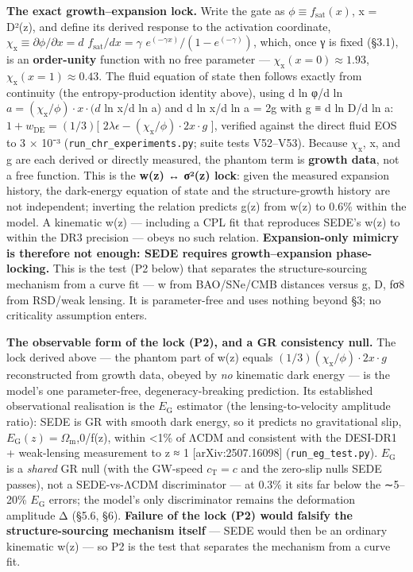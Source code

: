 \documentclass[
  10pt,
]{article}
\begin{document}
\textbf{The exact growth--expansion lock.} Write the gate as
\(\phi  \equiv  f_{\mathrm{sat}}(x)\), x = D²(z), and define its derived
response to the activation coordinate,
\(\chi _{\mathrm{x}} \equiv  \partial \phi /\partial x = d\)
\(f_{\mathrm{sat}}/dx = \gamma\) \(e^(-\gamma x)/(1 - e^(-\gamma ))\),
which, once γ is fixed (§3.1), is an \textbf{order-unity} function with
no free parameter --- \(\chi _{\mathrm{x}}(x=0) \approx  1.93\),
\(\chi _{\mathrm{x}}(x=1) \approx  0.43\). The fluid equation of state
then follows exactly from continuity (the entropy-production identity
above), using d ln φ/d ln
\(a = (\chi _{\mathrm{x}}/\phi )\cdot x\cdot (d\) ln x/d ln a) and d ln
x/d ln a = 2g with g ≡ d ln D/d ln a: \(1 + w_{\mathrm{DE}} = (1/3)[\)
\(2\lambda \epsilon  - (\chi _{\mathrm{x}}/\phi )\cdot 2x\cdot g\) {]},
verified against the direct fluid EOS to 3 × 10⁻³
(\texttt{run\_chr\_experiments.py}; suite tests V52--V53). Because
\(\chi _{\mathrm{x}}\), x, and g are each derived or directly measured,
the phantom term is \textbf{growth data}, not a free function. This is
the \textbf{w(z) ↔ σ²(z) lock}: given the measured expansion history,
the dark-energy equation of state and the structure-growth history are
not independent; inverting the relation predicts g(z) from w(z) to 0.6\%
within the model. A kinematic w(z) --- including a CPL fit that
reproduces SEDE's w(z) to within the DR3 precision --- obeys no such
relation. \textbf{Expansion-only mimicry is therefore not enough: SEDE
requires growth--expansion phase-locking.} This is the test (P2 below)
that separates the structure-sourcing mechanism from a curve fit --- w
from BAO/SNe/CMB distances versus g, D, fσ8 from RSD/weak lensing. It is
parameter-free and uses nothing beyond §3; no criticality assumption
enters.

\textbf{The observable form of the lock (P2), and a GR consistency
null.} The lock derived above --- the phantom part of w(z) equals
\((1/3)(\chi _{\mathrm{x}}/\phi )\cdot 2x\cdot g\) reconstructed from
growth data, obeyed by \emph{no} kinematic dark energy --- is the
model's one parameter-free, degeneracy-breaking prediction. Its
established observational realisation is the \(E_{\mathrm{G}}\)
estimator (the lensing-to-velocity amplitude ratio): SEDE is GR with
smooth dark energy, so it predicts no gravitational slip,
\(E_{\mathrm{G}}(z) = \Omega _{\mathrm{m}}\),0/f(z), within \textless1\%
of ΛCDM and consistent with the DESI-DR1 + weak-lensing measurement to z
≈ 1 {[}arXiv:2507.16098{]} (\texttt{run\_eg\_test.py}).
\(E_{\mathrm{G}}\) is a \emph{shared} GR null (with the GW-speed
\(c_{\mathrm{T}} = c\) and the zero-slip nulls SEDE passes), not a
SEDE-vs-ΛCDM discriminator --- at 0.3\% it sits far below the ∼5--20\%
\(E_{\mathrm{G}}\) errors; the model's only discriminator remains the
deformation amplitude Δ (§5.6, §6). \textbf{Failure of the lock (P2)
would falsify the structure-sourcing mechanism itself} --- SEDE would
then be an ordinary kinematic w(z) --- so P2 is the test that separates
the mechanism from a curve fit.
\end{document}
